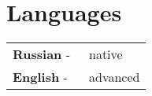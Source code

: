 \documentclass{ncv}
\begin{document}
\section{Languages}

\begin{tabular}{ l l }
\textbf{Russian} - & \ native\\ 
\textbf{English} - & \ advanced    
\end{tabular}
%	
%	
%	
%	
%
%	
\end{document}
